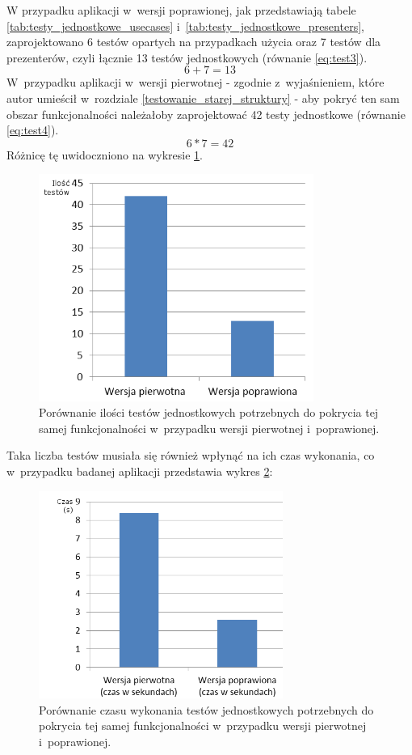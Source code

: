 \newpage
W przypadku aplikacji w~wersji poprawionej, jak przedstawiają tabele \ref{tab:testy_jednostkowe_usecases} i~\ref{tab:testy_jednostkowe_presenters}, zaprojektowano 6 testów opartych na przypadkach użycia oraz 7 testów dla prezenterów, czyli łącznie 13 testów jednostkowych (równanie \ref{eq:test3}).
\begin{equation}
6+7 = 13 \label{eq:test3}
\end{equation}
W~przypadku aplikacji w~wersji pierwotnej - zgodnie z~wyjaśnieniem, które autor umieścił w~rozdziale \ref{testowanie_starej_struktury} - aby pokryć ten sam obszar funkcjonalności należałoby zaprojektować 42 testy jednostkowe (równanie \ref{eq:test4}).
\begin{equation}
6*7 = 42 \label{eq:test4}
\end{equation}
Różnicę tę uwidoczniono na wykresie \ref{fig:app_ut_liczba}.
\begin{figure}[!htb]
    \centering
    \includegraphics[width=9cm]{imgs/ch6_app_ut_liczba_pl.png}
    \caption
{Porównanie ilości testów jednostkowych potrzebnych do pokrycia tej samej funkcjonalności w~przypadku wersji pierwotnej i~poprawionej. }
    \label{fig:app_ut_liczba}
\end{figure} 

Taka liczba testów musiała się również wpłynąć na ich czas wykonania, co w~przypadku badanej aplikacji przedstawia wykres \ref{fig:app_ut_czas}:
\begin{figure}[!htb]
    \centering
    \includegraphics[width=8cm]{imgs/ch6_app_ut_czas.png}
    \caption
{Porównanie czasu wykonania testów jednostkowych potrzebnych do pokrycia tej samej funkcjonalności w~przypadku wersji pierwotnej i~poprawionej. }
    \label{fig:app_ut_czas}
\end{figure} 

